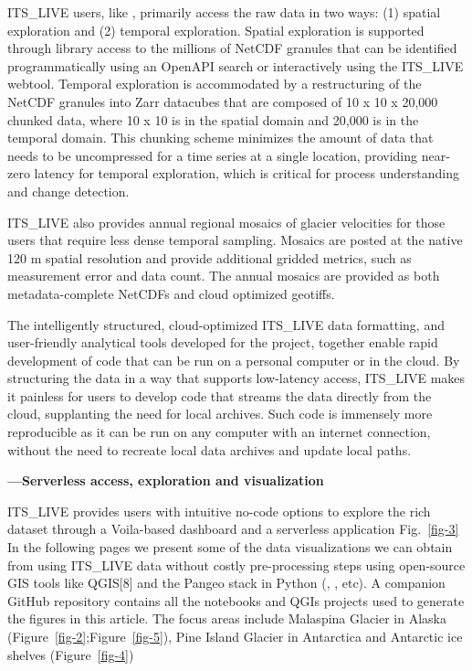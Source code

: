 \documentclass[
  super,
  preprint,
  3p,
  twocolumn]{elsarticle}
\begin{document}
ITS\_LIVE users, like \citep[most Earth
Scientists][]{abernathey2021cloud, Marshall2022-je}, primarily access
the raw data in two ways: (1) spatial exploration and (2) temporal
exploration. Spatial exploration is supported through library access to
the millions of NetCDF granules that can be identified programmatically
using an OpenAPI search or interactively using the ITS\_LIVE webtool.
Temporal exploration is accommodated by a restructuring of the NetCDF
granules into Zarr datacubes that are composed of 10 x 10 x 20,000
chunked data, where 10 x 10 is in the spatial domain and 20,000 is in
the temporal domain. This chunking scheme minimizes the amount of data
that needs to be uncompressed for a time series at a single location,
providing near-zero latency for temporal exploration, which is critical
for process understanding and change detection.

ITS\_LIVE also provides annual regional mosaics of glacier velocities
for those users that require less dense temporal sampling. Mosaics are
posted at the native 120 m spatial resolution and provide additional
gridded metrics, such as measurement error and data count. The annual
mosaics are provided as both metadata-complete NetCDFs and cloud
optimized geotiffs.

\newpage{}

The intelligently structured, cloud-optimized ITS\_LIVE data formatting,
and user-friendly analytical tools developed for the project, together
enable rapid development of code that can be run on a personal computer
or in the cloud. By structuring the data in a way that supports
low-latency access, ITS\_LIVE makes it painless for users to develop
code that streams the data directly from the cloud, supplanting the need
for local archives. Such code is immensely more reproducible as it can
be run on any computer with an internet connection, without the need to
recreate local data archives and update local paths.

\textbf{---Serverless access, exploration and visualization}

ITS\_LIVE provides users with intuitive no-code options to explore the
rich dataset through a Voila-based dashboard and a serverless
application Fig.~\ref{fig-3} In the following pages we present some of
the data visualizations we can obtain from using ITS\_LIVE data without
costly pre-processing steps using open-source GIS tools like QGIS{[}8{]}
and the Pangeo stack in Python (\citep[Xarray][]{Hoyer2017-su},
\citep[Zarr][]{Miles2023-yj} , etc). A companion GitHub repository
contains all the notebooks and QGIs projects used to generate the
figures in this article. The focus areas include Malaspina Glacier in
Alaska (Figure~\ref{fig-2};Figure~\ref{fig-5}), Pine Island Glacier in
Antarctica and Antarctic ice shelves (Figure~\ref{fig-4})
\end{document}
